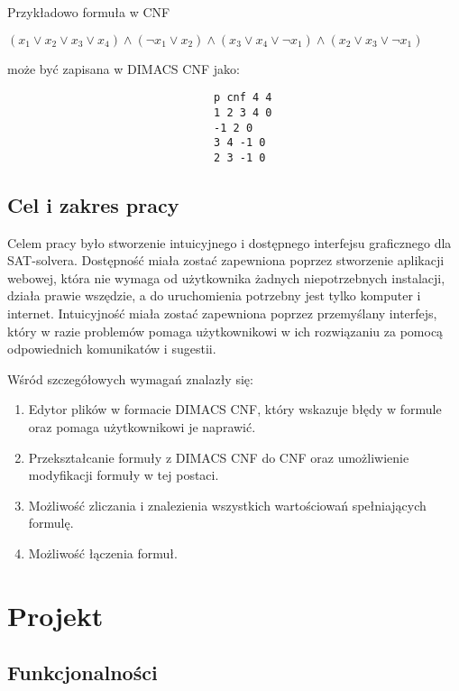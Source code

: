 \documentclass[a4paper,12pt]{book}
\theoremstyle{definition}
\begin{document}
Przykładowo formuła w CNF

\begin{center}
    $(x_1 \lor x_2 \lor x_3 \lor x_4) \land (\neg x_1 \lor x_2) \land (x_3 \lor x_4 \lor \neg x_1) \land (x_2 \lor x_3 \lor \neg x_1)$ 
\end{center}

może być zapisana w DIMACS CNF jako:

\begin{verbatim}
                                p cnf 4 4
                                1 2 3 4 0
                                -1 2 0
                                3 4 -1 0
                                2 3 -1 0
\end{verbatim}

\section{Cel i zakres pracy}

Celem pracy było stworzenie intuicyjnego i dostępnego interfejsu graficznego dla SAT-solvera. Dostępność miała zostać zapewniona poprzez stworzenie aplikacji webowej, która nie wymaga od użytkownika żadnych niepotrzebnych instalacji, działa prawie wszędzie, a do uruchomienia potrzebny jest tylko komputer i internet. Intuicyjność miała zostać zapewniona poprzez przemyślany interfejs, który w razie problemów pomaga użytkownikowi w ich rozwiązaniu za pomocą odpowiednich komunikatów i sugestii.

Wśród szczegółowych wymagań znalazły się:

\begin{enumerate}
    \item Edytor plików w formacie DIMACS CNF, który wskazuje błędy w formule oraz pomaga użytkownikowi je naprawić.
    \item Przekształcanie formuły z DIMACS CNF do CNF oraz umożliwienie modyfikacji formuły w tej postaci.
    \item Możliwość zliczania i znalezienia wszystkich wartościowań spełniających formulę.
    \item Możliwość łączenia formuł.
\end{enumerate}

\chapter{Projekt}

\section{Funkcjonalności}
\end{document}
